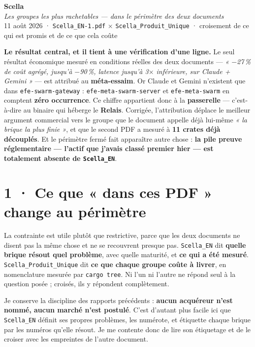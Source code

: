 \documentclass[10pt]{article}
\newcommand{\code}[1]{\texttt{\small #1}}
\newcommand{\x}{$\times$}
\newcommand{\pc}{\,\%}
\begin{document}
\begin{center}
{\Huge\bfseries\color{navy} Scella}\\[4pt]
{\large\color{grey}\itshape Les groupes les plus rachetables --- dans le périmètre des deux documents}\\[4pt]
{\small\color{grey} 11 août 2026 \; · \; \code{Scella\_EN-1.pdf} \x{} \code{Scella\_Produit\_Unique} \; · \; croisement de ce qui est promis et de ce que cela coûte}
\end{center}
\vspace{2pt}

\begin{these}
\textbf{Le résultat central, et il tient à une vérification d'une ligne.} Le seul résultat économique
mesuré en conditions réelles des deux documents --- \emph{« $-$27\pc{} de coût agrégé, jusqu'à
$-$90\pc, latence jusqu'à 3\x{} inférieure, sur Claude + Gemini »} --- est attribué au
\textbf{méta-essaim}. Or Claude et Gemini n'existent que dans \code{efe-swarm-gateway} :
\code{efe-meta-swarm-server} et \code{efe-meta-swarm} en comptent \textbf{zéro occurrence}. Ce chiffre
appartient donc à la \textbf{passerelle} --- c'est-à-dire au binaire qui héberge le \textbf{Relais}.
Corrigée, l'attribution déplace le meilleur argument commercial vers le groupe que le document appelle
déjà lui-même \emph{« la brique la plus finie »}, et que le second PDF a mesuré à \textbf{11 crates
déjà découplés}. Et le périmètre fermé fait apparaître autre chose : \textbf{la pile preuve
réglementaire --- l'actif que j'avais classé premier hier --- est totalement absente de
\code{Scella\_EN}}.
\end{these}

\section{1 · Ce que « dans ces PDF » change au périmètre}

La contrainte est utile plutôt que restrictive, parce que les deux documents ne disent pas la même
chose et ne se recouvrent presque pas. \code{Scella\_EN} dit \textbf{quelle brique résout quel
problème}, avec quelle maturité, et \textbf{ce qui a été mesuré}. \code{Scella\_Produit\_Unique} dit
\textbf{ce que chaque groupe coûte à livrer}, en nomenclature mesurée par \code{cargo tree}. Ni l'un ni
l'autre ne répond seul à la question posée ; croisés, ils y répondent complètement.

Je conserve la discipline des rapports précédents : \textbf{aucun acquéreur n'est nommé, aucun marché
n'est postulé}. C'est d'autant plus facile ici que \code{Scella\_EN} définit ses propres problèmes,
les numérote, et étiquette chaque brique par les numéros qu'elle résout. Je me contente donc de lire
son étiquetage et de le croiser avec les empreintes de l'autre document.
\end{document}
